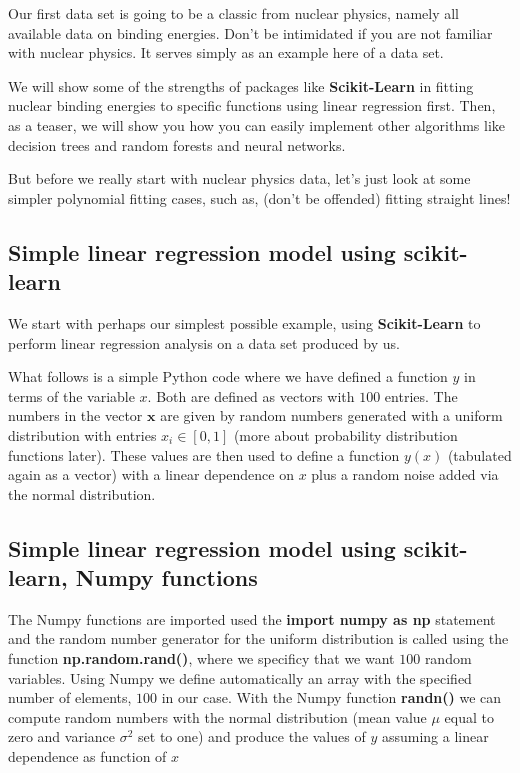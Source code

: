 \documentclass[%
oneside,                 %
final,                   %
10pt]{article}
\begin{document}
Our first data set is going to be a classic from nuclear physics, namely all
available data on binding energies. Don't be intimidated if you are not familiar with nuclear physics. It serves simply as an example here of a data set. 

We will show some of the
strengths of packages like \textbf{Scikit-Learn} in fitting nuclear binding energies to
specific functions using linear regression first. Then, as a teaser, we will show you how 
you can easily implement other algorithms like decision trees and random forests and neural networks.

But before we really start with nuclear physics data, let's just look at some simpler polynomial fitting cases, such as,
(don't be offended) fitting straight lines!

\subsection*{Simple linear regression model using \textbf{scikit-learn}}

We start with perhaps our simplest possible example, using \textbf{Scikit-Learn} to perform linear regression analysis on a data set produced by us. 

What follows is a simple Python code where we have defined a function
$y$ in terms of the variable $x$. Both are defined as vectors with  $100$ entries. 
The numbers in the vector $\bm{x}$ are given
by random numbers generated with a uniform distribution with entries
$x_i \in [0,1]$ (more about probability distribution functions
later). These values are then used to define a function $y(x)$
(tabulated again as a vector) with a linear dependence on $x$ plus a
random noise added via the normal distribution.


\subsection*{Simple linear regression model using \textbf{scikit-learn}, Numpy functions}

The Numpy functions are imported used the \textbf{import numpy as np}
statement and the random number generator for the uniform distribution
is called using the function \textbf{np.random.rand()}, where we specificy
that we want $100$ random variables.  Using Numpy we define
automatically an array with the specified number of elements, $100$ in
our case.  With the Numpy function \textbf{randn()} we can compute random
numbers with the normal distribution (mean value $\mu$ equal to zero and
variance $\sigma^2$ set to one) and produce the values of $y$ assuming a linear
dependence as function of $x$
\end{document}

